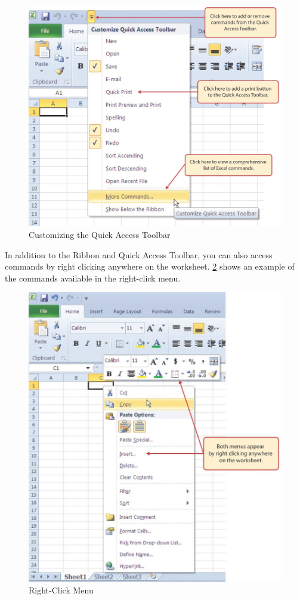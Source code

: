 \begin{figure}[H]
	\centering
	\includegraphics[width=\maxwidth{.95\linewidth}]{gfx/ch01_fig07}
	\caption{Customizing the Quick Access Toolbar}
	\label{01:fig07}
\end{figure}

In addition to the Ribbon and Quick Access Toolbar, you can also access commands by right clicking anywhere on the worksheet. \ref{01:fig08} shows an example of the commands available in the right-click menu.

\begin{figure}[H]
	\centering
	\includegraphics[width=\maxwidth{.95\linewidth}]{gfx/ch01_fig08}
	\caption{Right-Click Menu}
	\label{01:fig08}
\end{figure}

